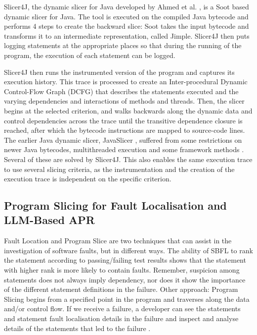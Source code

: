 \documentclass[sigconf,nonacm]{acmart}
\begin{document}
Slicer4J, the dynamic slicer for Java developed by Ahmed et al. \cite{Ahmed2021Slicer4J}, is a Soot \cite{ValleeRai1999Soot} based dynamic slicer for Java. The tool is executed on the compiled Java bytecode and performs 4 steps to create the backward slice: Soot takes the input bytecode and transforms it to an intermediate representation, called Jimple. Slicer4J then puts logging statements at the appropriate places so that during the running of the program, the execution of each statement can be logged.

Slicer4J then runs the instrumented version of the program and captures its execution history. This trace is processed to create an Inter-procedural Dynamic Control-Flow Graph (DCFG) that describes the statements executed and the varying dependencies and interactions of methods and threads. Then, the slicer begins at the selected criterion, and walks backwards along the dynamic data and control dependencies across the trace until the transitive dependence closure is reached, after which the bytecode instructions are mapped to source-code lines. The earlier Java dynamic slicer, JavaSlicer \cite{Hammacher2008JavaSlicer}, suffered from some restrictions on newer Java bytecodes, multithreaded execution and some framework methods \cite{Arzt2014FlowDroid}. Several of these are solved by Slicer4J. This also enables the same execution trace to use several slicing criteria, as the instrumentation and the creation of the execution trace is independent on the specific criterion.

\subsection{Program Slicing for Fault Localisation and LLM-Based APR}

Fault Location and Program Slice are two techniques that can assist in the investigation of software faults, but in different ways. The ability of SBFL to rank the statement according to passing/failing test results shows that the statement with higher rank is more likely to contain faults. Remember, suspicion among statements does not always imply dependency, nor does it show the importance of the different statement definitions in the failure. Other approach: Program Slicing begins from a specified point in the program and traverses along the data and/or control flow. If we receive a failure, a developer can see the statements and statement fault localisation details in the failure and inspect and analyse details of the statements that led to the failure \cite{Ahmed2021Slicer4J, Korel1988Dynamic}.
\end{document}
